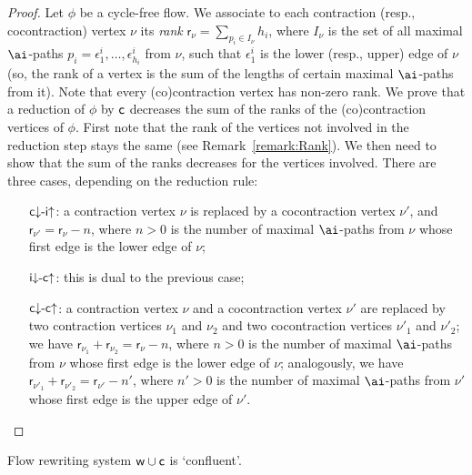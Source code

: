 \newcommand{\rk}{{\mathsf r}}
\begin{proof}
Let $\phi$ be a cycle-free flow. We associate to each contraction (resp., cocontraction) vertex $\nu$ its \emph{rank} $\rk_\nu=\sum_{p_i\in I_\nu}h_i$, where $I_\nu$ is the set of all maximal $\ai$-paths $p_i=\epsilon^i_1,\dots,\epsilon^i_{h_i}$ from $\nu$, such that $\epsilon^i_1$ is the lower (resp., upper) edge of $\nu$ (so, the rank of a vertex is the sum of the lengths of certain maximal $\ai$-paths from it). Note that every (co)contraction vertex has non-zero rank. We prove that a reduction of $\phi$ by ${\mathsf c}$ decreases the sum of the ranks of the (co)contraction vertices of $\phi$. First note that the rank of the vertices not involved in the reduction step stays the same (see Remark~\vref{remark:Rank}). We then need to show that the sum of the ranks decreases for the vertices involved. There are three cases, depending on the reduction rule:
\begin{itemize}
%
\item[${{\mathsf c}{\downarrow}{\hbox{-}}{\mathsf i}{\uparrow }}$:]a contraction vertex $\nu$ is replaced by a cocontraction vertex $\nu'$, and $\rk_{\nu'}=\rk_\nu-n$, where $n>0$ is the number of maximal $\ai$-paths from $\nu$ whose first edge is the lower edge of $\nu$;
%
\item[${{\mathsf i}{\downarrow}{\hbox{-}}{\mathsf c}{\uparrow }}$:]this is dual to the previous case;
%
\item[${{\mathsf c}{\downarrow}{\hbox{-}}{\mathsf c}{\uparrow }}$:]a contraction vertex $\nu$ and a cocontraction vertex $\nu'$ are replaced by two contraction vertices $\nu_1$ and $\nu_2$ and two cocontraction vertices $\nu'_1$ and $\nu'_2$; we have $\rk_{\nu_1}+\rk_{\nu_2}=\rk_\nu-n$, where $n>0$ is the number of maximal $\ai$-paths from $\nu$ whose first edge is the lower edge of $\nu$; analogously, we have $\rk_{\nu'_1}+\rk_{\nu'_2}=\rk_{\nu'}-n'$, where $n'>0$ is the number of maximal $\ai$-paths from $\nu'$ whose first edge is the upper edge of $\nu'$.
\end{itemize}
\end{proof}


\begin{conjecture}\label{conjecture:RewritingSystemContractionWeakeningConfluent}
Flow rewriting system\/ ${\mathsf w}\cup{\mathsf c}$ is `confluent'.
\end{conjecture}

